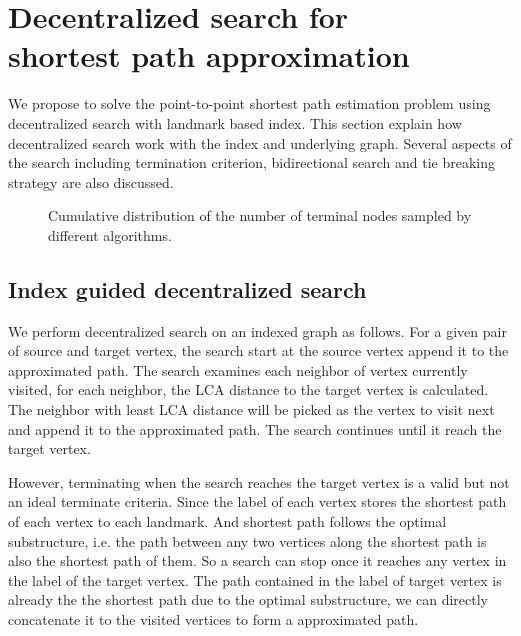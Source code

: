 \section{Decentralized search for \\ shortest path approximation}
\label{searching}

We propose to solve the point-to-point shortest path estimation problem using decentralized search with landmark based index. This section explain how decentralized search work with the index and underlying graph. Several aspects of the search including termination criterion, bidirectional search and tie breaking strategy are also discussed. 

\begin{figure*}[t]
    \centering
    \caption{Cumulative distribution of the number of terminal nodes sampled by different algorithms.}
    \label{fig:cum_dis}
\end{figure*}

\subsection{Index guided decentralized search}

We perform decentralized search on an indexed graph as follows. For a given pair of source and target vertex, the search start at the source vertex append it to the approximated path. The search examines each neighbor of vertex currently visited, for each neighbor, the LCA distance to the target vertex is calculated. The neighbor with least LCA distance will be picked as the vertex to visit next and append it to the approximated path. The search continues until it reach the target vertex. 

However, terminating when the search reaches the target vertex is a valid but not an ideal terminate criteria. Since the label of each vertex stores the shortest path of each vertex to each landmark. And shortest path follows the optimal substructure, i.e. the path between any two vertices along the shortest path is also the shortest path of them. So a search can stop once it  reaches any vertex in the label of the target vertex. The path contained in the label of target vertex is already the the shortest path due to the optimal substructure, we can directly concatenate it to the visited vertices to form a approximated path. 

